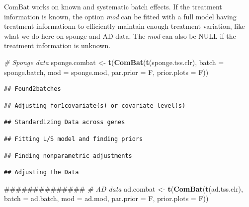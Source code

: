 \documentclass[]{book}
\newenvironment{Shaded}{\begin{snugshade}}{\end{snugshade}}
\newcommand{\KeywordTok}[1]{\textcolor[rgb]{0.13,0.29,0.53}{\textbf{#1}}}
\newcommand{\DataTypeTok}[1]{\textcolor[rgb]{0.13,0.29,0.53}{#1}}
\newcommand{\StringTok}[1]{\textcolor[rgb]{0.31,0.60,0.02}{#1}}
\newcommand{\CommentTok}[1]{\textcolor[rgb]{0.56,0.35,0.01}{\textit{#1}}}
\newcommand{\NormalTok}[1]{#1}
\begin{document}
ComBat works on known and systematic batch effects. If the treatment
information is known, the option \emph{mod} can be fitted with a full
model having treatment informationn to efficiently maintain enough
treatment variation, like what we do here on sponge and AD data. The
\emph{mod} can also be NULL if the treatment information is unknown.

\begin{Shaded}
\begin{Highlighting}[]
\CommentTok{# Sponge data}
\NormalTok{sponge.combat <-}\StringTok{ }\KeywordTok{t}\NormalTok{(}\KeywordTok{ComBat}\NormalTok{(}\KeywordTok{t}\NormalTok{(sponge.tss.clr), }\DataTypeTok{batch =}\NormalTok{ sponge.batch, }
                          \DataTypeTok{mod =}\NormalTok{ sponge.mod, }\DataTypeTok{par.prior =}\NormalTok{ F, }\DataTypeTok{prior.plots =}\NormalTok{ F))}
\end{Highlighting}
\end{Shaded}

\begin{verbatim}
## Found2batches
\end{verbatim}

\begin{verbatim}
## Adjusting for1covariate(s) or covariate level(s)
\end{verbatim}

\begin{verbatim}
## Standardizing Data across genes
\end{verbatim}

\begin{verbatim}
## Fitting L/S model and finding priors
\end{verbatim}

\begin{verbatim}
## Finding nonparametric adjustments
\end{verbatim}

\begin{verbatim}
## Adjusting the Data
\end{verbatim}

\begin{Shaded}
\begin{Highlighting}[]
\NormalTok{##############}
\CommentTok{# AD data}
\NormalTok{ad.combat <-}\StringTok{ }\KeywordTok{t}\NormalTok{(}\KeywordTok{ComBat}\NormalTok{(}\KeywordTok{t}\NormalTok{(ad.tss.clr), }\DataTypeTok{batch =}\NormalTok{ ad.batch, }
                      \DataTypeTok{mod =}\NormalTok{ ad.mod, }\DataTypeTok{par.prior =}\NormalTok{ F, }\DataTypeTok{prior.plots =}\NormalTok{ F))}
\end{Highlighting}
\end{Shaded}
\end{document}
